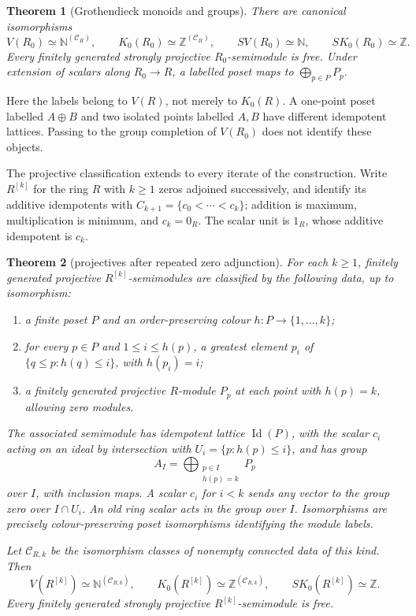 \documentclass[11pt]{amsart}
\newcommand{\Z}{\mathbb Z}
\newcommand{\N}{\mathbb N}
\DeclareMathOperator{\Id}{Id}
\newtheorem{theorem}{Theorem}[section]
\theoremstyle{definition}
\theoremstyle{remark}
\begin{document}
\begin{theorem}[Grothendieck monoids and groups]\label{thm:Kzero}
There are canonical isomorphisms
\[
 V(R_0)\simeq\N^{(\mathcal C_R)},\qquad
 K_0(R_0)\simeq\Z^{(\mathcal C_R)},\qquad
 SV(R_0)\simeq\N,\qquad SK_0(R_0)\simeq\Z.
\]
Every finitely generated strongly projective $R_0$-semimodule is free. Under extension of scalars along $R_0\to R$, a labelled poset maps to $\bigoplus_{p\in P}P_p$.
\end{theorem}

Here the labels belong to $V(R)$, not merely to $K_0(R)$. A one-point poset labelled $A\oplus B$ and two isolated points labelled $A,B$ have different idempotent lattices. Passing to the group completion of $V(R_0)$ does not identify these objects.

The projective classification extends to every iterate of the construction. Write $R^{[k]}$ for the ring $R$ with $k\ge1$ zeros adjoined successively, and identify its additive idempotents with $C_{k+1}=\{c_0<\cdots<c_k\}$; addition is maximum, multiplication is minimum, and $c_k=0_R$. The scalar unit is $1_R$, whose additive idempotent is $c_k$.

\begin{theorem}[projectives after repeated zero adjunction]\label{thm:iteratedprojective}
For each $k\ge1$, finitely generated projective $R^{[k]}$-semimodules are classified by the following data, up to isomorphism:
\begin{enumerate}
\item a finite poset $P$ and an order-preserving colour $h:P\to\{1,\ldots,k\}$;
\item for every $p\in P$ and $1\le i\le h(p)$, a greatest element $p_i$ of $\{q\le p:h(q)\le i\}$, with $h(p_i)=i$;
\item a finitely generated projective $R$-module $P_p$ at each point with $h(p)=k$, allowing zero modules.
\end{enumerate}
The associated semimodule has idempotent lattice $\Id(P)$, with the scalar $c_i$ acting on an ideal by intersection with $U_i=\{p:h(p)\le i\}$, and has group
\[
 A_I=\bigoplus_{\substack{p\in I\\h(p)=k}}P_p
\]
over $I$, with inclusion maps. A scalar $c_i$ for $i<k$ sends any vector to the group zero over $I\cap U_i$. An old ring scalar acts in the group over $I$. Isomorphisms are precisely colour-preserving poset isomorphisms identifying the module labels.

Let $\mathcal C_{R,k}$ be the isomorphism classes of nonempty connected data of this kind. Then
\[
 V(R^{[k]})\simeq\N^{(\mathcal C_{R,k})},\qquad
 K_0(R^{[k]})\simeq\Z^{(\mathcal C_{R,k})},\qquad
 SK_0(R^{[k]})\simeq\Z.
\]
Every finitely generated strongly projective $R^{[k]}$-semimodule is free.
\end{theorem}
\end{document}
